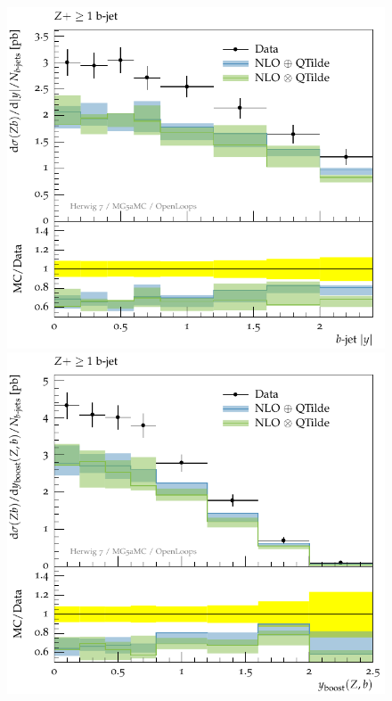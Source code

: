 \documentclass[11pt]{cernrep}
\begin{document}
\begin{figure}[htbp]
\begin{center}
   \includegraphics[scale=0.65]{figs/zbb/herwig4F/atlas-d05-x01-y01.pdf}
   \includegraphics[scale=0.65]{figs/zbb/herwig4F/atlas-d07-x01-y01.pdf} \\

\end{center}
\end{figure}
\end{document}
